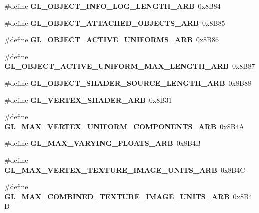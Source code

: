 \begin{DoxyCompactItemize}
\item 
\#define {\bfseries G\+L\+\_\+\+O\+B\+J\+E\+C\+T\+\_\+\+I\+N\+F\+O\+\_\+\+L\+O\+G\+\_\+\+L\+E\+N\+G\+T\+H\+\_\+\+A\+R\+B}~0x8\+B84\label{_s_d_l__opengl_8h_a15891ff4b57899953121ddc1b4526861}

\item 
\#define {\bfseries G\+L\+\_\+\+O\+B\+J\+E\+C\+T\+\_\+\+A\+T\+T\+A\+C\+H\+E\+D\+\_\+\+O\+B\+J\+E\+C\+T\+S\+\_\+\+A\+R\+B}~0x8\+B85\label{_s_d_l__opengl_8h_a819dcf0331519d9319bb20d356e6a5e1}

\item 
\#define {\bfseries G\+L\+\_\+\+O\+B\+J\+E\+C\+T\+\_\+\+A\+C\+T\+I\+V\+E\+\_\+\+U\+N\+I\+F\+O\+R\+M\+S\+\_\+\+A\+R\+B}~0x8\+B86\label{_s_d_l__opengl_8h_ae477a6628ae48bd715fcb4705cfd167c}

\item 
\#define {\bfseries G\+L\+\_\+\+O\+B\+J\+E\+C\+T\+\_\+\+A\+C\+T\+I\+V\+E\+\_\+\+U\+N\+I\+F\+O\+R\+M\+\_\+\+M\+A\+X\+\_\+\+L\+E\+N\+G\+T\+H\+\_\+\+A\+R\+B}~0x8\+B87\label{_s_d_l__opengl_8h_aff17daa38f5bbcb24ba5baa75ad34218}

\item 
\#define {\bfseries G\+L\+\_\+\+O\+B\+J\+E\+C\+T\+\_\+\+S\+H\+A\+D\+E\+R\+\_\+\+S\+O\+U\+R\+C\+E\+\_\+\+L\+E\+N\+G\+T\+H\+\_\+\+A\+R\+B}~0x8\+B88\label{_s_d_l__opengl_8h_a80a858ed3f18341de6ebaa6240a8624c}

\item 
\#define {\bfseries G\+L\+\_\+\+V\+E\+R\+T\+E\+X\+\_\+\+S\+H\+A\+D\+E\+R\+\_\+\+A\+R\+B}~0x8\+B31\label{_s_d_l__opengl_8h_a8db63d8394d2fb15d70fdac444e7c868}

\item 
\#define {\bfseries G\+L\+\_\+\+M\+A\+X\+\_\+\+V\+E\+R\+T\+E\+X\+\_\+\+U\+N\+I\+F\+O\+R\+M\+\_\+\+C\+O\+M\+P\+O\+N\+E\+N\+T\+S\+\_\+\+A\+R\+B}~0x8\+B4\+A\label{_s_d_l__opengl_8h_a850faeb33d8331c55479e63e30d4a1df}

\item 
\#define {\bfseries G\+L\+\_\+\+M\+A\+X\+\_\+\+V\+A\+R\+Y\+I\+N\+G\+\_\+\+F\+L\+O\+A\+T\+S\+\_\+\+A\+R\+B}~0x8\+B4\+B\label{_s_d_l__opengl_8h_ad0c4f1236242ba4b674f5eb54a528a32}

\item 
\#define {\bfseries G\+L\+\_\+\+M\+A\+X\+\_\+\+V\+E\+R\+T\+E\+X\+\_\+\+T\+E\+X\+T\+U\+R\+E\+\_\+\+I\+M\+A\+G\+E\+\_\+\+U\+N\+I\+T\+S\+\_\+\+A\+R\+B}~0x8\+B4\+C\label{_s_d_l__opengl_8h_af5eaa1888813d3c68513faeb334bb346}

\item 
\#define {\bfseries G\+L\+\_\+\+M\+A\+X\+\_\+\+C\+O\+M\+B\+I\+N\+E\+D\+\_\+\+T\+E\+X\+T\+U\+R\+E\+\_\+\+I\+M\+A\+G\+E\+\_\+\+U\+N\+I\+T\+S\+\_\+\+A\+R\+B}~0x8\+B4\+D\label{_s_d_l__opengl_8h_ad35a87121920e6462b479e26dfaf69a5}


\end{DoxyCompactItemize}
